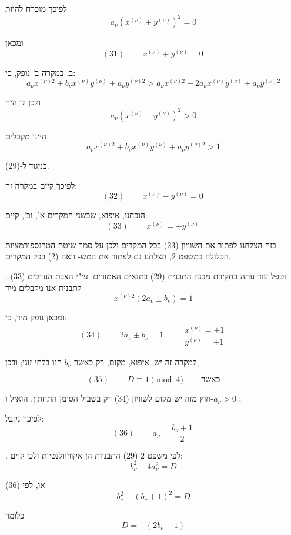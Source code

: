 \noindent לפיכך מוכרח להיות
\[ a_\nu \left(x^{(\nu)} + y^{(\nu)}\right)^2 = 0 \]

\noindent ומכאן
\[ (31) \qquad \boxed{\, x^{(\nu)} + y^{(\nu)} = 0 \,} \]

\noindent \textbf{ב.} במקרה ב' נופק, כי:
\[ a_\nu x^{(\nu)2} + b_\nu x^{(\nu)} y^{(\nu)} + a_\nu y^{(\nu)2} >
a_\nu x^{(\nu)2} - 2a_\nu x^{(\nu)} y^{(\nu)} + a_\nu y^{(\nu)2} \]

\noindent ולכן לו היה
\[ a_\nu \left(x^{(\nu)} - y^{(\nu)}\right)^2 > 0 \]

\noindent היינו מקבלים
\[ a_\nu x^{(\nu)2} + b_\nu x^{(\nu)} y^{(\nu)} + a_\nu y^{(\nu)2} > 1 \]

\noindent בניגוד ל-(29).

\noindent לפיכך קיים במקרה זה:
\[ (32) \qquad \boxed{\, x^{(\nu)} - y^{(\nu)} = 0 \,} \]

\noindent הוכחנו, איפוא, שבשני המקרים א', וב', קיים:
\[ (33) \qquad \boxed{\, x^{(\nu)} = \pm y^{(\nu)} \,} \]

\noindent בזה הצלחנו לפתור את השוויון (23) בכל המקרים ולכן על סמך
שיטת הטרנספורמציות הכלולה במשפט 2, הצלחנו גם לפתור את המש-
וואה (2) בכל המקרים.

\medskip
{}. נטפל עוד עתה בחקירת מבנה התבנית (29) בתנאים האמורים.
עי"י הצבת הערכים (33) לתבנית אנו מקבלים מיד
\[ x^{(\nu)2}(2a_\nu \pm b_\nu) = 1 \]

\noindent ומכאן נופק מיד, כי:
\[ (34) \qquad \boxed{\, 2a_\nu \pm b_\nu = 1 \,} \qquad \boxed{\begin{array}{l} x^{(\nu)} = \pm 1 \\ y^{(\nu)} = \pm 1 \end{array}} \]

\noindent למקרה זה יש, איפוא, מקום, רק כאשר $b_\nu$ הנו בלתי-זוגי; ובכן,

\[ (35) \qquad \boxed{\, D \equiv 1 \pmod{4} \,} \qquad \text{כאשר} \]

\noindent חוץ מזה יש מקום לשוויון (34) רק בשביל הסימן התחתון, הואיל
ו-$a_\nu > 0$ ;

\noindent לפיכך נקבל:
\[ (36) \qquad \boxed{\, a_\nu = \dfrac{b_\nu + 1}{2} \,} \]

\medskip
{}. לפי משפט 2 (29) התבניות הן אקוויוולנטיות ולכן קיים:
\[ b_\nu^2 - 4a_\nu^2 = D \]

\noindent או, לפי (36)
\[ b_\nu^2 - (b_\nu + 1)^2 = D \]

\noindent כלומר
\[ D = -(2b_\nu + 1) \]

